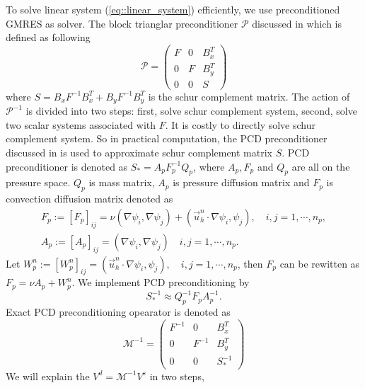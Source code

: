 \documentclass{eajam}
\begin{document}
  To solve linear system (\ref{eq::linear_system}) efficiently, we 
  use preconditioned GMRES as solver. The block trianglar
  preconditioner $\mathcal{P}$ discussed in \cite{elman2005finite}
  which is defined as following
  \begin{equation}
    \mathcal{P} = 
    \left( 
      \begin{array}{lll}
        F & 0 & B_x^T \\
        0 & F  & B_y^T \\
        0 & 0 & S
      \end{array}
    \right)
  \end{equation}
  where $S = B_xF^{-1}B_x^T + B_yF^{-1}B_y^T$ is the schur complement
  matrix. The action of $\mathcal{P}^{-1}$ is divided into two steps:
  first, solve schur complement system, second, solve two scalar
  systems associated with $F$. It is costly to directly solve schur
  complement system. So in practical computation, the PCD
  preconditioner discussed in \cite{elman2005finite} is used to
  approximate schur complement matrix $S$. PCD preconditioner is
  denoted as $S_* = A_p F_p^{-1} Q_p$, where $A_p, F_p$ and $Q_p$ are
  all on the pressure space. $Q_p$ is mass matrix, $A_p$ is pressure
  diffusion matrix and $F_p$ is convection diffusion matrix denoted as
  \begin{eqnarray}
    F_p := [F_p]_{ij} = \nu (\nabla \psi_i, \nabla \psi_j) +
    (\vec{u}_h^n \cdot \nabla \psi_i, \psi_j), \quad i,j = 1, \cdots, n_p, \\
    A_p := [A_p]_{ij} = (\nabla \psi_i, \nabla \psi_j)\quad i,j = 1, \cdots,
    n_p.
    \label{eq::pcd_mat}
  \end{eqnarray}
  Let $W_p^n := [W_p^n]_{ij} = (\vec{u}_h^n \cdot \nabla \psi_i,
  \psi_j), \quad i,j = 1, \cdots, n_p$, then $F_p$ can be rewitten as
  $F_p = \nu A_p + W_p^n$. We implement PCD preconditioning by 
  \begin{equation}
    S_*^{-1} \approx Q_p^{-1} F_p A_p^{-1}.
  \end{equation}
  Exact PCD preconditioning opearator is denoted as 
  \begin{equation}
    \mathcal{M}^{-1} = 
    \left(
      \begin{array}{lll}
        F^{-1} & 0 & B_x^T \\
        0 & F^{-1} & B_y^T \\
        0 & 0 &S_*^{-1}
      \end{array}
    \right)
  \end{equation}
  We will explain the $V^d = \mathcal{M}^{-1} V^s$ in two steps,
\end{document}

